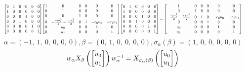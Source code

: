 \documentclass[11pt]{article}
\theoremstyle{definition}
\begin{document}
\[
\scaletoalign{\textwidth}{{\left[\begin{matrix}0 & 1 & 0 & 0 & 0 & 0\\1 & 0 & 0 & 0 & 0 & 0\\0 & 0 & 0 & 1 & 0 & 0\\0 & 0 & 1 & 0 & 0 & 0\\0 & 0 & 0 & 0 & 1 & 0\\0 & 0 & 0 & 0 & 0 & 1\end{matrix}\right]} {\left[\begin{matrix}1 & 0 & 0 & 0 & 0 & 0\\0 & 1 & 0 & 0 & 0 & 0\\0 & 0 & 1 & 0 & 0 & 0\\0 & - \frac{c_{0} u_{0}^{2}}{2} - \frac{c_{1} u_{1}^{2}}{2} & 0 & 1 & - c_{0} u_{0} & - c_{1} u_{1}\\0 & u_{0} & 0 & 0 & 1 & 0\\0 & u_{1} & 0 & 0 & 0 & 1\end{matrix}\right]} {\left[\begin{matrix}0 & 1 & 0 & 0 & 0 & 0\\1 & 0 & 0 & 0 & 0 & 0\\0 & 0 & 0 & 1 & 0 & 0\\0 & 0 & 1 & 0 & 0 & 0\\0 & 0 & 0 & 0 & 1 & 0\\0 & 0 & 0 & 0 & 0 & 1\end{matrix}\right]} = {\left[\begin{matrix}1 & 0 & 0 & 0 & 0 & 0\\0 & 1 & 0 & 0 & 0 & 0\\- \frac{c_{0} u_{0}^{2}}{2} - \frac{c_{1} u_{1}^{2}}{2} & 0 & 1 & 0 & - c_{0} u_{0} & - c_{1} u_{1}\\0 & 0 & 0 & 1 & 0 & 0\\u_{0} & 0 & 0 & 0 & 1 & 0\\u_{1} & 0 & 0 & 0 & 0 & 1\end{matrix}\right]}}
\]
\[
\alpha = \left( -1, \  1, \  0, \  0, \  0, \  0\right), \beta = \left( 0, \  1, \  0, \  0, \  0, \  0\right), \sigma_{\alpha}(\beta) = \left( 1, \  0, \  0, \  0, \  0, \  0\right)
\]
\[
\scaletoalign{\textwidth}{w_{\alpha} X_{\beta}\left(\left[\begin{matrix}u_{0}\\u_{1}\end{matrix}\right]\right) w_{\alpha}^{-1} = X_{\sigma_{\alpha}\left(\beta\right)}\left(\left[\begin{matrix}u_{0}\\u_{1}\end{matrix}\right]\right)}
\]
\end{document}
